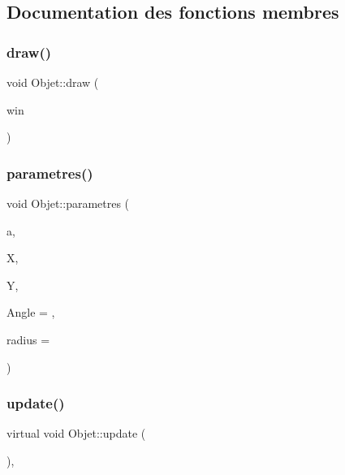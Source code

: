 \subsection{Documentation des fonctions membres}
\mbox{\label{class_objet_a9d1d8178549d070d7c40635efae24b5e}} 
\subsubsection{\texorpdfstring{draw()}{draw()}}
{\footnotesize\ttfamily void Objet\+::draw (\begin{DoxyParamCaption}\item[{sf\+::\+Render\+Window \&}]{win }\end{DoxyParamCaption})\hspace{0.3cm}{\ttfamily [inline]}}

\mbox{\label{class_objet_ad4b867d62bf9b79a23d6017cc36b6641}} 
\subsubsection{\texorpdfstring{parametres()}{parametres()}}
{\footnotesize\ttfamily void Objet\+::parametres (\begin{DoxyParamCaption}\item[{\hyperlink{class_animation}{Animation} \&}]{a,  }\item[{float}]{X,  }\item[{float}]{Y,  }\item[{float}]{Angle = {},  }\item[{int}]{radius = {} }\end{DoxyParamCaption})\hspace{0.3cm}{\ttfamily [inline]}}

\mbox{\label{class_objet_a684611b20eb6e6df5e4743dd3e42385a}} 
\subsubsection{\texorpdfstring{update()}{update()}}
{\footnotesize\ttfamily virtual void Objet\+::update (\begin{DoxyParamCaption}{ }\end{DoxyParamCaption})\hspace{0.3cm}{\ttfamily [inline]}, {\ttfamily [virtual]}}



